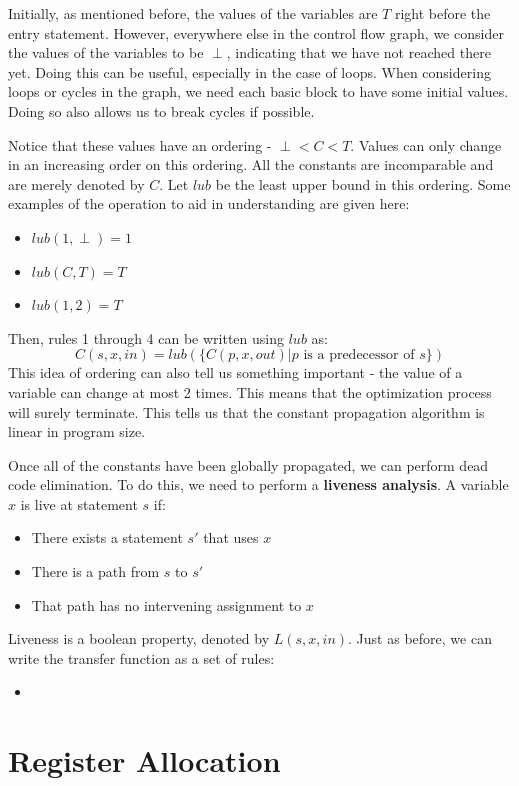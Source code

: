\documentclass[12pt,letterpaper]{book}
\theoremstyle{definition}
\begin{document}
Initially, as mentioned before, the values of the variables are $T$ right before the entry statement. However, everywhere else in the control flow graph, we consider the values of the variables to be $\perp$, indicating that we have not reached there yet. Doing this can be useful, especially in the case of loops. When considering loops or cycles in the graph, we need each basic block to have some initial values. Doing so also allows us to break cycles if possible.

Notice that these values have an ordering - $\perp < C < T$. Values can only change in an increasing order on this ordering. All the constants are incomparable and are merely denoted by $C$. Let $lub$ be the least upper bound in this ordering. Some examples of the operation to aid in understanding are given here:
\begin{itemize}
  \item $lub(1, \perp) = 1$
  \item $lub(C,T) = T$
  \item $lub(1,2) = T$
\end{itemize}
Then, rules 1 through 4 can be written using $lub$ as:
\[C(s,x,in) = lub( \{ C(p,x,out) | p \text{ is a predecessor of }s\} )\]
This idea of ordering can also tell us something important - the value of a variable can change at most 2 times. This means that the optimization process will surely terminate. This tells us that the constant propagation algorithm is linear in program size.

Once all of the constants have been globally propagated, we can perform dead code elimination. To do this, we need to perform a \textbf{liveness analysis}. A variable $x$ is live at statement $s$ if:
\begin{itemize}
  \item There exists a statement $s'$ that uses $x$
  \item There is a path from $s$ to $s'$
  \item That path has no intervening assignment to $x$
\end{itemize}
Liveness is a boolean property, denoted by $L(s,x,in)$. Just as before, we can write the transfer function as a set of rules:
\begin{itemize}
  \item 
\end{itemize}

\section{Register Allocation}
\end{document}
